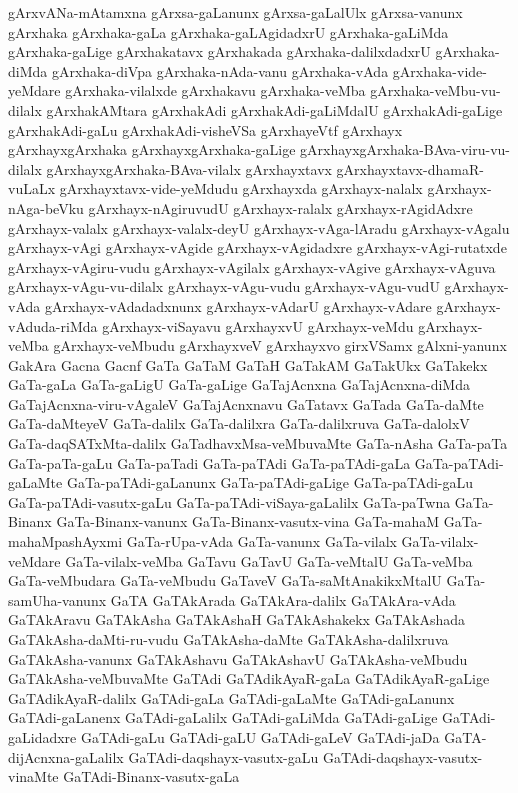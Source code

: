 {gArxvANa-mAtamxna
gArxsa-gaLanunx
gArxsa-gaLalUlx
gArxsa-vanunx
gArxhaka
gArxhaka-gaLa
gArxhaka-gaLAgidadxrU
gArxhaka-gaLiMda
gArxhaka-gaLige
gArxhakatavx
gArxhakada
gArxhaka-dalilxdadxrU
gArxhaka-diMda
gArxhaka-diVpa
gArxhaka-nAda-vanu
gArxhaka-vAda
gArxhaka-vide-yeMdare
gArxhaka-vilalxde
gArxhakavu
gArxhaka-veMba
gArxhaka-veMbu-vu-dilalx
gArxhakAMtara
gArxhakAdi
gArxhakAdi-gaLiMdalU
gArxhakAdi-gaLige
gArxhakAdi-gaLu
gArxhakAdi-visheVSa
gArxhayeVtf
gArxhayx
gArxhayxgArxhaka
gArxhayxgArxhaka-gaLige
gArxhayxgArxhaka-BAva-viru-vu-dilalx
gArxhayxgArxhaka-BAva-vilalx
gArxhayxtavx
gArxhayxtavx-dhamaR-vuLaLx
gArxhayxtavx-vide-yeMdudu
gArxhayxda
gArxhayx-nalalx
gArxhayx-nAga-beVku
gArxhayx-nAgiruvudU
gArxhayx-ralalx
gArxhayx-rAgidAdxre
gArxhayx-valalx
gArxhayx-valalx-deyU
gArxhayx-vAga-lAradu
gArxhayx-vAgalu
gArxhayx-vAgi
gArxhayx-vAgide
gArxhayx-vAgidadxre
gArxhayx-vAgi-rutatxde
gArxhayx-vAgiru-vudu
gArxhayx-vAgilalx
gArxhayx-vAgive
gArxhayx-vAguva
gArxhayx-vAgu-vu-dilalx
gArxhayx-vAgu-vudu
gArxhayx-vAgu-vudU
gArxhayx-vAda
gArxhayx-vAdadadxnunx
gArxhayx-vAdarU
gArxhayx-vAdare
gArxhayx-vAduda-riMda
gArxhayx-viSayavu
gArxhayxvU
gArxhayx-veMdu
gArxhayx-veMba
gArxhayx-veMbudu
gArxhayxveV
gArxhayxvo
girxVSamx
gAlxni-yanunx
GakAra
Gacna
Gacnf
GaTa
GaTaM
GaTaH
GaTakAM
GaTakUkx
GaTakekx
GaTa-gaLa
GaTa-gaLigU
GaTa-gaLige
GaTajAcnxna
GaTajAcnxna-diMda
GaTajAcnxna-viru-vAgaleV
GaTajAcnxnavu
GaTatavx
GaTada
GaTa-daMte
GaTa-daMteyeV
GaTa-dalilx
GaTa-dalilxra
GaTa-dalilxruva
GaTa-dalolxV
GaTa-daqSATxMta-dalilx
GaTadhavxMsa-veMbuvaMte
GaTa-nAsha
GaTa-paTa
GaTa-paTa-gaLu
GaTa-paTadi
GaTa-paTAdi
GaTa-paTAdi-gaLa
GaTa-paTAdi-gaLaMte
GaTa-paTAdi-gaLanunx
GaTa-paTAdi-gaLige
GaTa-paTAdi-gaLu
GaTa-paTAdi-vasutx-gaLu
GaTa-paTAdi-viSaya-gaLalilx
GaTa-paTwna
GaTa-Binanx
GaTa-Binanx-vanunx
GaTa-Binanx-vasutx-vina
GaTa-mahaM
GaTa-mahaMpashAyxmi
GaTa-rUpa-vAda
GaTa-vanunx
GaTa-vilalx
GaTa-vilalx-veMdare
GaTa-vilalx-veMba
GaTavu
GaTavU
GaTa-veMtalU
GaTa-veMba
GaTa-veMbudara
GaTa-veMbudu
GaTaveV
GaTa-saMtAnakikxMtalU
GaTa-samUha-vanunx
GaTA
GaTAkArada
GaTAkAra-dalilx
GaTAkAra-vAda
GaTAkAravu
GaTAkAsha
GaTAkAshaH
GaTAkAshakekx
GaTAkAshada
GaTAkAsha-daMti-ru-vudu
GaTAkAsha-daMte
GaTAkAsha-dalilxruva
GaTAkAsha-vanunx
GaTAkAshavu
GaTAkAshavU
GaTAkAsha-veMbudu
GaTAkAsha-veMbuvaMte
GaTAdi
GaTAdikAyaR-gaLa
GaTAdikAyaR-gaLige
GaTAdikAyaR-dalilx
GaTAdi-gaLa
GaTAdi-gaLaMte
GaTAdi-gaLanunx
GaTAdi-gaLanenx
GaTAdi-gaLalilx
GaTAdi-gaLiMda
GaTAdi-gaLige
GaTAdi-gaLidadxre
GaTAdi-gaLu
GaTAdi-gaLU
GaTAdi-gaLeV
GaTAdi-jaDa
GaTA-dijAcnxna-gaLalilx
GaTAdi-daqshayx-vasutx-gaLu
GaTAdi-daqshayx-vasutx-vinaMte
GaTAdi-Binanx-vasutx-gaLa
}
